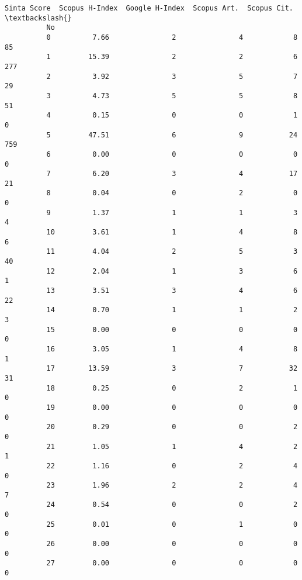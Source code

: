 \documentclass[11pt]{article}
\begin{document}
\begin{Verbatim}[commandchars=\\\{\}]
              Sinta Score  Scopus H-Index  Google H-Index  Scopus Art.  Scopus Cit.  \textbackslash{}
          No                                                                          
          0          7.66               2               4            8           85   
          1         15.39               2               2            6          277   
          2          3.92               3               5            7           29   
          3          4.73               5               5            8           51   
          4          0.15               0               0            1            0   
          5         47.51               6               9           24          759   
          6          0.00               0               0            0            0   
          7          6.20               3               4           17           21   
          8          0.04               0               2            0            0   
          9          1.37               1               1            3            4   
          10         3.61               1               4            8            6   
          11         4.04               2               5            3           40   
          12         2.04               1               3            6            1   
          13         3.51               3               4            6           22   
          14         0.70               1               1            2            3   
          15         0.00               0               0            0            0   
          16         3.05               1               4            8            1   
          17        13.59               3               7           32           31   
          18         0.25               0               2            1            0   
          19         0.00               0               0            0            0   
          20         0.29               0               0            2            0   
          21         1.05               1               4            2            1   
          22         1.16               0               2            4            0   
          23         1.96               2               2            4            7   
          24         0.54               0               0            2            0   
          25         0.01               0               1            0            0   
          26         0.00               0               0            0            0   
          27         0.00               0               0            0            0   

\end{Verbatim}
\end{document}
